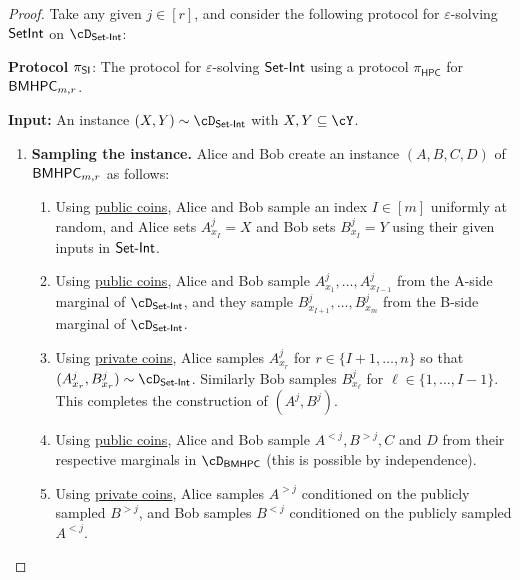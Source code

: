 \documentclass[11pt,letterpaper]{article}
\newcommand{\eps}{\varepsilon}
\newcommand{\HPC}{\mathsf{HPC}}
\theoremstyle{definition}
\newenvironment{abox}{\begin{tcolorbox}[
		enlarge top by=5pt,
		enlarge bottom by=5pt,
		breakable,
		frame hidden,
		overlay broken = {
			\draw[line width=1pt, black]
			(frame.north west) rectangle (frame.south east);},
		overlay = {
			\draw[line width=1pt, black]
			(frame.north west) rectangle (frame.south east);},
		boxsep=0pt,
		left=4pt,
		right=4pt,
		top=10pt,
		arc=0pt,
		boxrule=1pt,toprule=1pt,
		colback=white
	]}
{\end{tcolorbox}}
\newcommand{\bmhpc}{\ensuremath{\textnormal{\textsf{BMHPC}}}\xspace}
\newcommand{\setint}{\ensuremath{\textnormal{\textsf{SetInt}}}\xspace}
\newcommand{\prot}{\ensuremath{\pi}}
\newcommand{\bA}{\bm{A}}
\newcommand{\bB}{\ensuremath{\bm{B}}}
\newcommand{\bC}{\ensuremath{\bm{C}}}
\newcommand{\bD}{\ensuremath{\bm{D}}}
\newcommand{\protHPC}{\ensuremath{\prot_{\HPC}}}
\newcommand{\distHPC}{\ensuremath{\dist_{\HPC}}}
\newcommand{\protSI}{\ensuremath{\prot}_{\ensuremath{\textnormal{\textsf{SI}}}}\xspace}
\newcommand{\SI}{\ensuremath{\textnormal{\textsf{Set-Int}}}\xspace}
\begin{document}
\begin{proof}
    Take any given $j \in [r]$, and consider the following protocol for
    $\eps$-solving $\setint$ on $\cD_{\SI}$:
    
	\begin{abox}
    \textbf{Protocol $\protSI$}: The protocol for $\eps$-solving $\SI$ using a protocol $\protHPC$ for $\bmhpc_{m,r}$. 
    
     \smallskip
    
    \textbf{Input:} An instance $(X, Y) \sim \cD_\SI$ with $X, Y\subseteq\cY$.
    
    
    \begin{enumerate}
    	\item \textbf{Sampling the instance.} Alice and Bob create an instance
        $(A, B, C, D)$ of $\bmhpc_{m,r}$ as follows: %
	\begin{enumerate}
	
 \item Using \underline{public coins}, Alice and Bob sample an index
   $I \in [m]$ uniformly at random, and  
	Alice sets $A^j_{x_I} = X$ and Bob sets $B^j_{x_I} = Y$ using their given inputs in $\SI$. 
	
 \item Using \underline{public coins}, Alice and Bob sample $A^j_{x_1}, \ldots, A^j_{x_{I-1}}$ from the A-side marginal of $\cD_\SI$, and they sample $B^j_{x_{I+1}}, \ldots, B^j_{x_{m}}$ from the B-side marginal of $\cD_\SI$. 
	
 \item Using \underline{private coins}, Alice samples $A^j_{x_r}$ for $r \in \{I+1, \ldots, n\}$ so that $(A^j_{x_r},B^j_{x_r}) \sim \cD_\SI$. Similarly Bob samples $B^j_{x_\ell}$ for $\ell \in \{1, \ldots, I-1\}$. This completes the construction of $(A^j, B^j)$. 
        
 \item Using \underline{public coins}, Alice and Bob sample $A^{< j}, B^{> j}, C$ and $D$ from their respective marginals in $\cD_\bmhpc$ (this is possible by independence).
 \item Using \underline{private coins}, Alice samples $A^{> j}$ conditioned on the publicly sampled $B^{>j}$, and Bob samples $B^{< j}$ conditioned on the publicly sampled $A^{<j}$. 

        \end{enumerate}
        

\end{enumerate}
\end{abox}
\end{proof}
\end{document}
